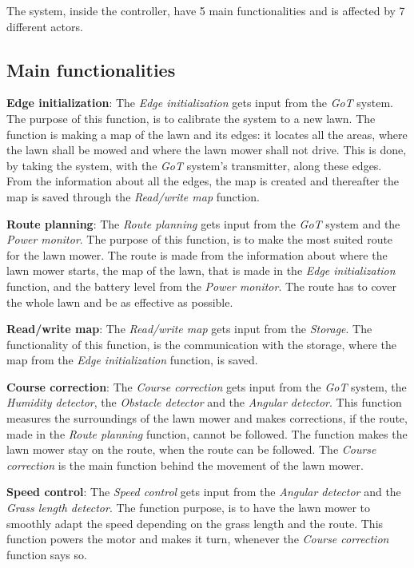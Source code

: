 \noindent
The system, inside the controller, have 5 main functionalities and is affected by 7 different actors.


\subsection{Main functionalities}

\textbf{Edge initialization}:
The \textit{Edge initialization} gets input from the \textit{GoT} system. The purpose of this function, is to calibrate the system to a new lawn. The function is making a map of the lawn and its edges: it locates all the areas, where the lawn shall be mowed and where the lawn mower shall not drive. This is done, by taking the system, with the \textit{GoT} system's transmitter, along these edges. From the information about all the edges, the map is created and thereafter the map is saved through the \textit{Read/write map} function.

\textbf{Route planning}:
The \textit{Route planning} gets input from the \textit{GoT} system and the \textit{Power monitor}. The purpose of this function, is to make the most suited route for the lawn mower. The route is made from the information about where the lawn mower starts, the map of the lawn, that is made in the \textit{Edge initialization} function, and the battery level from the \textit{Power monitor}. The route has to cover the whole lawn and be as effective as possible.

\textbf{Read/write map}:
The \textit{Read/write map} gets input from the \textit{Storage}. The functionality of this function, is the communication with the storage, where the map from the \textit{Edge initialization} function, is saved. 

\textbf{Course correction}:
The \textit{Course correction} gets input from the \textit{GoT} system, the \textit{Humidity detector}, the \textit{Obstacle detector} and the \textit{Angular detector}. This function measures the surroundings of the lawn mower and makes corrections, if the route, made in the \textit{Route planning} function, cannot be followed. The function makes the lawn mower stay on the route, when the route can be followed. The \textit{Course correction} is the main function behind the movement of the lawn mower.

\textbf{Speed control}:
The \textit{Speed control} gets input from the \textit{Angular detector} and the \textit{Grass length detector}. The function purpose, is to have the lawn mower to smoothly adapt the speed depending on the grass length and the route. This function powers the motor and makes it turn, whenever the \textit{Course correction} function says so.


